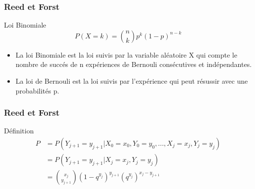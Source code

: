 \begin{frame}
    \frametitle{Reed et Forst}

    \begin{alertblock}{Loi Binomiale}
        $$ P(X = k) = \binom{n}{k}p^k(1 - p)^{n-k} $$
    \end{alertblock}

    \begin{itemize}
        \item La loi Binomiale est la loi suivis par la variable aléatoire X qui compte le nombre de succés de n expériences de Bernouli consécutives et indépendantes.
        \item La loi de Bernouli est la loi suivis par l'expérience qui peut résussir avec une probabilités p.
    \end{itemize}
\end{frame}

\begin{frame}
    \frametitle{Reed et Forst}

    \begin{alertblock}{Définition}
        \begin{align}
            P &= P(Y_{j+1} = y_{j+1} | X_0 = x_0, Y_0 = y_0, ..., X_j = x_j, Y_j = y_j) \\
              &= P(Y_{j+1} = y_{j+1} | X_j = x_j, Y_j = y_j) \\
              &= \binom{x_j}{y_{j+1}}(1 - q^{y_j})^{y_{j+1}}(q^{y_j})^{x_j - y_{j+1}}
        \end{align}
    \end{alertblock}
\end{frame}
